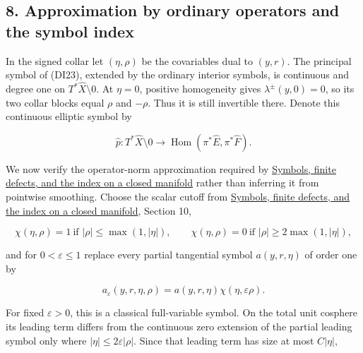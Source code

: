 \documentclass[
  11pt,
]{article}
\makeatletter
\let\ReaderOriginalAnchorStart\hyper@anchorstart
\let\ReaderOriginalAnchorEnd\hyper@anchorend
\let\ReaderPendingAliases\@empty
\def\ReaderArmAliases#1{\gdef\ReaderPendingAliases{#1}}
\def\hyper@anchorstart#1{\ReaderIfNativeAnchorTF{#1}{\ReaderPendingAliases\global\let\ReaderPendingAliases\@empty}{}\ReaderOriginalAnchorStart{#1}}
\makeatother
\begin{document}
\ReaderArmAliases{\ReaderOriginalAnchorStart{AN03-SDI-008}\ReaderOriginalAnchorEnd\begingroup\expandafter\def\csname @currentHref\endcsname{AN03-SDI-008}\label{AN03-SDI-008}\endgroup\ReaderOriginalAnchorStart{8-approximation-by-ordinary-operators-and-the-symbol-index}\ReaderOriginalAnchorEnd\begingroup\expandafter\def\csname @currentHref\endcsname{8-approximation-by-ordinary-operators-and-the-symbol-index}\label{8-approximation-by-ordinary-operators-and-the-symbol-index}\endgroup\ReaderOriginalAnchorStart{approximation-by-ordinary-operators-and-the-symbol-index}\ReaderOriginalAnchorEnd}
\subsection{8. Approximation by ordinary operators and the symbol
index}\label{approximation-by-ordinary-operators-and-the-symbol-index}

In the signed collar let \((\eta,\rho)\) be the covariables dual to
\((y,r)\). The principal symbol of (DI23), extended by the ordinary
interior symbols, is continuous and degree one on
\(T^*\widehat X\setminus0\). At \(\eta=0\), positive homogeneity gives
\(\lambda^\pm(y,0)=0\), so its two collar blocks equal \(\rho\) and
\(-\rho\). Thus it is still invertible there. Denote this continuous
elliptic symbol by

\[
 \widehat p:T^*\widehat X\setminus0
       \longrightarrow
       \operatorname{Hom}(\pi^*\widehat E,\pi^*\widehat F).
 \tag{DI35}
\]

We now verify the operator-norm approximation required by
\href{global-elliptic-symbol-index.pdf}{Symbols, finite defects, and the
index on a closed manifold} rather than inferring it from pointwise
smoothing. Choose the scalar cutoff from
\href{global-elliptic-symbol-index.pdf}{Symbols, finite defects, and the
index on a closed manifold}, Section 10,

\[
 \chi(\eta,\rho)=1\ \text{if }|\rho|\leq\max(1,|\eta|),
 \qquad
 \chi(\eta,\rho)=0\ \text{if }|\rho|\geq2\max(1,|\eta|),
 \tag{DI36}
\]

and for \(0<\varepsilon\leq1\) replace every partial tangential symbol
\(a(y,r,\eta)\) of order one by

\[
 a_\varepsilon(y,r,\eta,\rho)
       =a(y,r,\eta)\chi(\eta,\varepsilon\rho).
 \tag{DI37}
\]

For fixed \(\varepsilon>0\), this is a classical full-variable symbol.
On the total unit cosphere its leading term differs from the continuous
zero extension of the partial leading symbol only where
\(|\eta|\leq2\varepsilon|\rho|\). Since that leading term has size at
most \(C|\eta|\),
\end{document}
